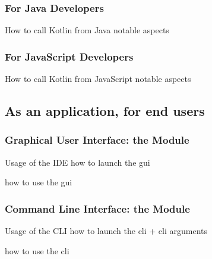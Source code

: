 \documentclass[handout]{beamer}
\begin{document}
\subsubsection{For Java Developers}

\begin{frame}[allowframebreaks]{How to call Kotlin from Java}
    notable aspects
\end{frame}

\subsubsection{For JavaScript Developers}

\begin{frame}[allowframebreaks]{How to call Kotlin from JavaScript}
    notable aspects
\end{frame}

\subsection{As an application, for end users}

\subsubsection{Graphical User Interface: the  Module}

\begin{frame}[allowframebreaks]{Usage of the IDE}
    how to launch the gui

    how to use the gui
\end{frame}

\subsubsection{Command Line Interface: the  Module}

\begin{frame}[allowframebreaks]{Usage of the CLI}
    how to launch the cli
        + cli arguments

    how to use the cli
\end{frame}

\section*{}
\frame{\titlepage}

\section*{\bibname}


\begin{frame}\frametitle{\refname}
    \footnotesize
    
    
\end{frame}

\end{document}
